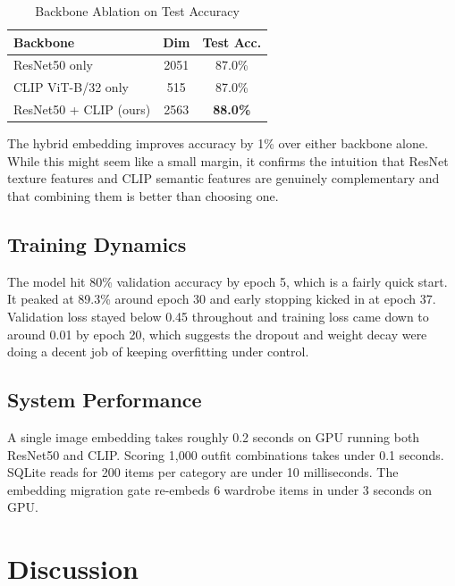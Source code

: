 \documentclass[conference]{IEEEtran}
\begin{document}
\begin{table}[htbp]
\caption{Backbone Ablation on Test Accuracy}
\begin{center}
\renewcommand{\arraystretch}{1.2}
\begin{tabular}{|l|c|c|}
\hline
\textbf{Backbone} & \textbf{Dim} & \textbf{Test Acc.} \\
\hline
ResNet50 only          & 2051 & 87.0\% \\
CLIP ViT-B/32 only     &  515 & 87.0\% \\
ResNet50 + CLIP (ours) & 2563 & \textbf{88.0\%} \\
\hline
\end{tabular}
\label{tab:ablation}
\end{center}
\end{table}

The hybrid embedding improves accuracy by 1\% over either backbone alone. While this might seem like a small margin, it confirms the intuition that ResNet texture features and CLIP semantic features are genuinely complementary and that combining them is better than choosing one.

\subsection{Training Dynamics}

The model hit 80\% validation accuracy by epoch 5, which is a fairly quick start. It peaked at 89.3\% around epoch 30 and early stopping kicked in at epoch 37. Validation loss stayed below 0.45 throughout and training loss came down to around 0.01 by epoch 20, which suggests the dropout and weight decay were doing a decent job of keeping overfitting under control.

\subsection{System Performance}

A single image embedding takes roughly 0.2 seconds on GPU running both ResNet50 and CLIP. Scoring 1,000 outfit combinations takes under 0.1 seconds. SQLite reads for 200 items per category are under 10 milliseconds. The embedding migration gate re-embeds 6 wardrobe items in under 3 seconds on GPU.

\section{Discussion}
\end{document}
